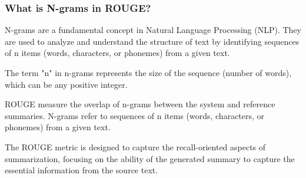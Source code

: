 \subsubsection{What is N-grams in ROUGE?}
\begin{bulletedlist}
	\item N-grams are a fundamental concept in Natural Language Processing (NLP). They are used to analyze and understand the structure of text by identifying sequences of n items (words, characters, or phonemes) from a given text.
	\item The term "n" in n-grams represents the size of the sequence (number of words), which can be any positive integer.
	\item ROUGE measure the overlap of n-grams between the system and reference summaries. N-grams refer to sequences of n items (words, characters, or phonemes) from a given text.
	\item The ROUGE metric is designed to capture the recall-oriented aspects of summarization, focusing on the ability of the generated summary to capture the essential information from the source text.
\end{bulletedlist}

